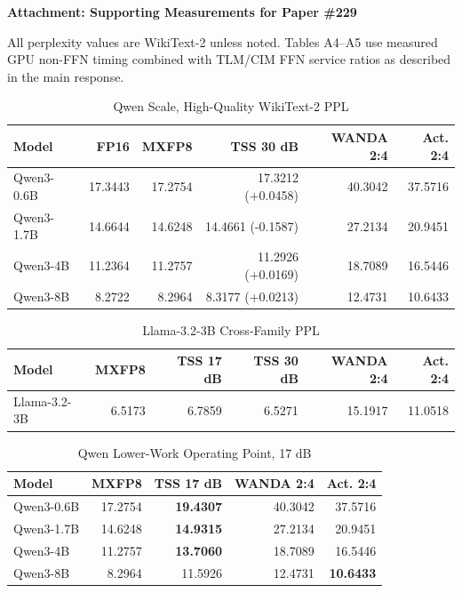 \documentclass[10pt]{article}
\begin{document}
\small
\textbf{\Large Attachment: Supporting Measurements for Paper \#229}

\vspace{0.5em}
All perplexity values are WikiText-2 unless noted. Tables A4--A5 use measured GPU
non-FFN timing combined with TLM/CIM FFN service ratios as described in the main
response.

\begin{table}[!ht]
\caption{Qwen Scale, High-Quality WikiText-2 PPL}
\begin{tabular}{lrrrrr}
\toprule
Model & FP16 & MXFP8 & TSS 30 dB & WANDA 2:4 & Act. 2:4 \\
\midrule
Qwen3-0.6B & 17.3443 & 17.2754 & 17.3212 (+0.0458) & 40.3042 & 37.5716 \\
Qwen3-1.7B & 14.6644 & 14.6248 & 14.4661 (-0.1587) & 27.2134 & 20.9451 \\
Qwen3-4B & 11.2364 & 11.2757 & 11.2926 (+0.0169) & 18.7089 & 16.5446 \\
Qwen3-8B & 8.2722 & 8.2964 & 8.3177 (+0.0213) & 12.4731 & 10.6433 \\
\bottomrule
\end{tabular}
\end{table}

\begin{table}[!ht]
\caption{Llama-3.2-3B Cross-Family PPL}
\begin{tabular}{lrrrrr}
\toprule
Model & MXFP8 & TSS 17 dB & TSS 30 dB & WANDA 2:4 & Act. 2:4 \\
\midrule
Llama-3.2-3B & 6.5173 & 6.7859 & 6.5271 & 15.1917 & 11.0518 \\
\bottomrule
\end{tabular}
\end{table}

\begin{table}[!ht]
\caption{Qwen Lower-Work Operating Point, 17 dB}
\begin{tabular}{lrrrr}
\toprule
Model & MXFP8 & TSS 17 dB & WANDA 2:4 & Act. 2:4 \\
\midrule
Qwen3-0.6B & 17.2754 & \textbf{19.4307} & 40.3042 & 37.5716 \\
Qwen3-1.7B & 14.6248 & \textbf{14.9315} & 27.2134 & 20.9451 \\
Qwen3-4B & 11.2757 & \textbf{13.7060} & 18.7089 & 16.5446 \\
Qwen3-8B & 8.2964 & 11.5926 & 12.4731 & \textbf{10.6433} \\
\bottomrule
\end{tabular}
\end{table}
\end{document}
